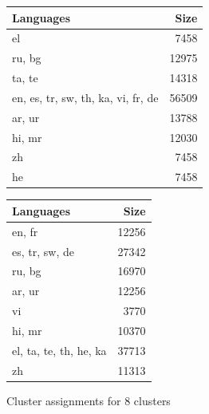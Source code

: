 \begin{figure}[p]
    \centering
    
    \begin{subtable}{0.49\textwidth}
        \centering
        \begin{tabular}{lr}
            \toprule
            Languages & Size \\
            \midrule
            el & 7458 \\
            ru, bg & 12975 \\
            ta, te & 14318 \\
            en, es, tr, sw, th, ka, vi, fr, de & 56509 \\
            ar, ur & 13788 \\
            hi, mr & 12030 \\
            zh & 7458 \\
            he & 7458 \\
            \bottomrule
            \end{tabular}
        \caption{\citet{chung_improving_2020}}
        \label{tab:chung_clusters_k8}
        

    \end{subtable}
    \hfill
    \begin{subtable}{0.49\textwidth}
        \centering
        \begin{tabular}{lr}
            \toprule
            Languages & Size \\
            \midrule
            en, fr & 12256 \\
            es, tr, sw, de & 27342 \\
            ru, bg & 16970 \\
            ar, ur & 12256 \\
            vi & 3770 \\
            hi, mr & 10370 \\
            el, ta, te, th, he, ka & 37713 \\
            zh & 11313 \\
            \bottomrule
        \end{tabular}
        \caption{\citet{liang_xlm-v_2023}}
        \label{tab:liang_clusters_k8}
    \end{subtable}

    \caption{Cluster assignments for 8 clusters}
    \label{fig:cluster_assignments_k8}
\end{figure}

